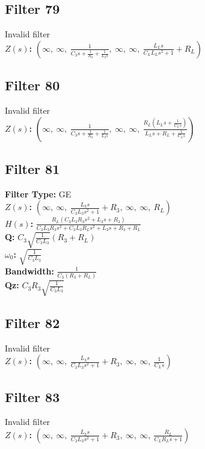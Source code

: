 \documentclass{article}
\begin{document}
\subsection*{Filter 79}
Invalid filter \\ 
\textbf{$Z(s)$:} $\left( \infty, \  \infty, \  \frac{1}{C_{3} s + \frac{1}{R_{3}} + \frac{1}{L_{3} s}}, \  \infty, \  \infty, \  \frac{L_{L} s}{C_{L} L_{L} s^{2} + 1} + R_{L}\right)$ \\ 
\subsection*{Filter 80}
Invalid filter \\ 
\textbf{$Z(s)$:} $\left( \infty, \  \infty, \  \frac{1}{C_{3} s + \frac{1}{R_{3}} + \frac{1}{L_{3} s}}, \  \infty, \  \infty, \  \frac{R_{L} \left(L_{L} s + \frac{1}{C_{L} s}\right)}{L_{L} s + R_{L} + \frac{1}{C_{L} s}}\right)$ \\ 
\subsection*{Filter 81}
\textbf{Filter Type:} GE \\ 
\textbf{$Z(s)$:} $\left( \infty, \  \infty, \  \frac{L_{3} s}{C_{3} L_{3} s^{2} + 1} + R_{3}, \  \infty, \  \infty, \  R_{L}\right)$ \\ 
\textbf{$H(s)$:} $\frac{R_{L} \left(C_{3} L_{3} R_{3} s^{2} + L_{3} s + R_{3}\right)}{C_{3} L_{3} R_{3} s^{2} + C_{3} L_{3} R_{L} s^{2} + L_{3} s + R_{3} + R_{L}}$ \\ 
\textbf{Q:} $C_{3} \sqrt{\frac{1}{C_{3} L_{3}}} \left(R_{3} + R_{L}\right)$ \\ 
\textbf{$\omega_0$:} $\sqrt{\frac{1}{C_{3} L_{3}}}$ \\ 
\textbf{Bandwidth:} $\frac{1}{C_{3} \left(R_{3} + R_{L}\right)}$ \\ 
\textbf{Qz:} $C_{3} R_{3} \sqrt{\frac{1}{C_{3} L_{3}}}$ \\ 
\subsection*{Filter 82}
Invalid filter \\ 
\textbf{$Z(s)$:} $\left( \infty, \  \infty, \  \frac{L_{3} s}{C_{3} L_{3} s^{2} + 1} + R_{3}, \  \infty, \  \infty, \  \frac{1}{C_{L} s}\right)$ \\ 
\subsection*{Filter 83}
Invalid filter \\ 
\textbf{$Z(s)$:} $\left( \infty, \  \infty, \  \frac{L_{3} s}{C_{3} L_{3} s^{2} + 1} + R_{3}, \  \infty, \  \infty, \  \frac{R_{L}}{C_{L} R_{L} s + 1}\right)$ \\ 
\end{document}

